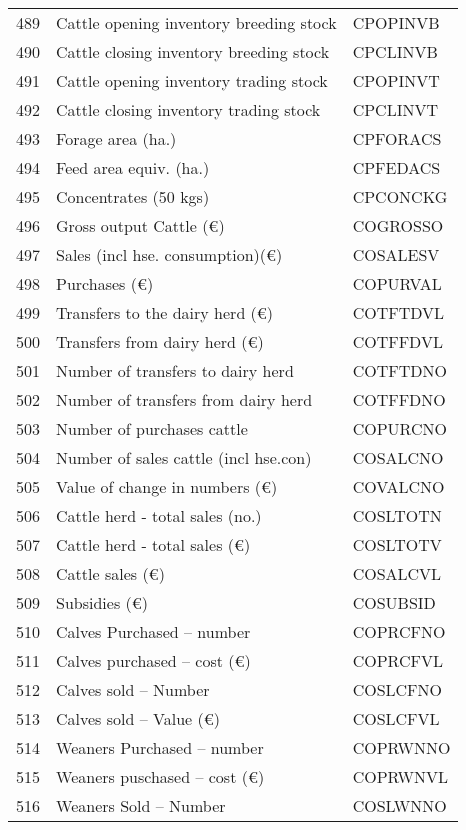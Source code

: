 \documentclass{article}\usepackage{graphicx, color}
\begin{document}
\begin{flushleft}
\begin{table}[ht]
\begin{center}
\begin{tabular}{rll}
  489 & Cattle opening inventory breeding stock & CPOPINVB \\ 
  490 & Cattle closing inventory breeding stock & CPCLINVB \\ 
  491 & Cattle opening inventory trading stock & CPOPINVT \\ 
  492 & Cattle closing inventory trading stock & CPCLINVT \\ 
  493 & Forage area (ha.) & CPFORACS \\ 
  494 & Feed area equiv. (ha.) & CPFEDACS \\ 
  495 & Concentrates   (50 kgs) & CPCONCKG \\ 
  496 & Gross output Cattle         (€) & COGROSSO \\ 
  497 & Sales (incl hse. consumption)(€) & COSALESV \\ 
  498 & Purchases                   (€) & COPURVAL \\ 
  499 & Transfers to the dairy herd (€) & COTFTDVL \\ 
  500 & Transfers from dairy herd   (€) & COTFFDVL \\ 
  501 & Number of transfers to dairy herd & COTFTDNO \\ 
  502 & Number of transfers from dairy herd & COTFFDNO \\ 
  503 & Number of purchases cattle & COPURCNO \\ 
  504 & Number of sales cattle (incl hse.con) & COSALCNO \\ 
  505 & Value of change in numbers   (€) & COVALCNO \\ 
  506 & Cattle herd - total sales     (no.) & COSLTOTN \\ 
  507 & Cattle herd - total sales     (€) & COSLTOTV \\ 
  508 & Cattle sales                 (€) & COSALCVL \\ 
  509 & Subsidies                    (€) & COSUBSID \\ 
  510 & Calves Purchased -- number & COPRCFNO \\ 
  511 & Calves purchased -- cost   (€) & COPRCFVL \\ 
  512 & Calves sold      -- Number & COSLCFNO \\ 
  513 & Calves sold      -- Value  (€) & COSLCFVL \\ 
  514 & Weaners Purchased -- number & COPRWNNO \\ 
  515 & Weaners puschased -- cost   (€) & COPRWNVL \\ 
  516 & Weaners Sold      -- Number & COSLWNNO \\ 

\end{tabular}
\end{center}
\end{table}
\end{flushleft}
\end{document}
